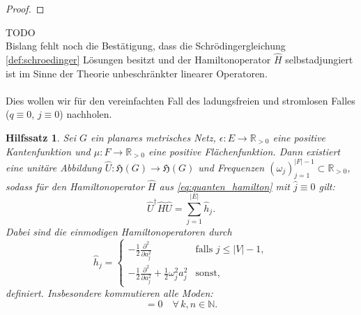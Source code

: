 \documentclass[11pt,a4paper,leqno]{report}
\newtheorem{lemma}[theorem]{Hilfssatz}
\numberwithin{equation}{chapter}
\begin{document}
\begin{proof}
\end{proof}
\noindent
TODO\\
\fi
Bislang fehlt noch die Bestätigung, dass die Schrödingergleichung \eqref{def:schroedinger} 
Lösungen besitzt und der Hamiltonoperator $\hat{H}$ selbstadjungiert ist 
im Sinne der Theorie unbeschränkter linearer Operatoren. 
\\
\\
Dies wollen wir für den vereinfachten Fall des ladungsfreien und stromlosen Falles (\(q\equiv 0\), \(j\equiv 0\)) nachholen.
\begin{lemma}\label{lem:hamilton_sum}
	Sei \(G\) ein planares metrisches Netz, \(\epsilon: E \to \mathbb{R}_{>0}\) eine positive 
	Kantenfunktion und \(\mu: F \to \mathbb{R}_{>0}\) eine positive Flächenfunktion. Dann existiert eine 
	unitäre Abbildung \(\hat{U}: \mathfrak{H}(G) \to \mathfrak{H}(G)\) und Frequenzen 
	\((\omega_j)_{j=1}^{|F|-1} \subset \mathbb{R}_{>0}\), sodass für den Hamiltonoperator 
	\(\hat{H}\) aus \eqref{eq:quanten_hamilton} mit \(\hat{j} \equiv 0\) gilt:
	\begin{equation}
		\hat{U}^\dagger \hat{H} \hat{U} = \sum_{j=1}^{|E|} \hat{h}_j. \label{eq:diagonal}
	\end{equation}
	Dabei sind die einmodigen Hamiltonoperatoren durch
	\begin{equation}
		\hat{h}_j = 
		\begin{cases} 
			-\frac{1}{2} \frac{\partial^2}{\partial a_j^2} & \text{falls } j \leq |V|-1, \\[6pt]
			-\frac{1}{2} \frac{\partial^2}{\partial a_j^2} + \frac{1}{2} \omega_j^2 a_j^2 & \text{sonst,}
		\end{cases} \label{eq:hj}
	\end{equation}
	definiert. Insbesondere kommutieren alle Moden:
	\begin{equation*}
		[\hat{h}_k, \hat{h}_n] = 0 \quad \forall\, k,n \in \mathbb{N}.
	\end{equation*}
\end{lemma}
\end{document}
